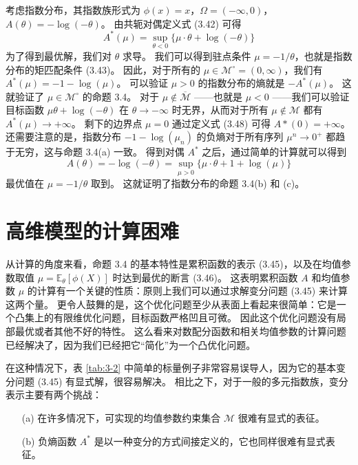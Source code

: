 \begin{tcolorbox}
\begin{exam}[指数模型的共轭对偶]
    
考虑指数分布，其指数族形式为 $\phi(x) = x$，$\Omega = (-\infty, 0)$，$A(\theta) = -\log(-\theta)$。
由共轭对偶定义式 (3.42) 可得
\begin{equation}
    A^*(\mu) = \sup_{\theta < 0}\{\mu\cdot\theta + \log(-\theta)\}
\end{equation}
为了得到最优解，我们对 $\theta$ 求导。
我们可以得到驻点条件 $\mu = -1/\theta$，也就是指数分布的矩匹配条件 (3.43)。
因此，对于所有的 $\mu \in \mathcal{M}^\circ = (0, \infty)$，我们有 $A^*(\mu) = -1 - \log(\mu)$。
可以验证 $\mu > 0$ 的指数分布的熵就是 $-A^*(\mu)$。
这就验证了 $\mu \in \mathcal{M}^\circ$ 的命题 3.4。
对于 $\mu \notin \overline{\mathcal{M}}$ ——也就是 $\mu < 0$ ——我们可以验证目标函数 $\mu\theta + \log(-\theta)$ 在 $\theta \to -\infty$ 时无界，从而对于所有 $\mu \notin \mathcal{M}$ 都有 $A^*(\mu) \to +\infty$。
剩下的边界点 $\mu = 0$ 通过定义式 (3.48) 可得 $A*(0) = +\infty$。
还需要注意的是，指数分布 $-1-\log(\mu_n)$ 的负熵对于所有序列 $\mu^n \to 0^+$ 都趋于无穷，这与命题 3.4(a) 一致。
得到对偶 $A^*$ 之后，通过简单的计算就可以得到
$$A(\theta) = -\log(-\theta) = \sup_{\mu > 0}\{\mu\cdot\theta + 1 + \log(\mu)\}$$
最优值在 $\mu = -1/\theta$ 取到。
这就证明了指数分布的命题 3.4(b) 和 (c)。

\end{exam}
\end{tcolorbox}

\section{高维模型的计算困难}

从计算的角度来看，命题 3.4 的基本特性是累积函数的表示 (3.45)，以及在均值参数取值 $\mu = \mathbb{E}_{\theta}[\phi(X)]$ 时达到最优的断言 (3.46)。
这表明累积函数 $A$ 和均值参数 $\mu$ 的计算有一个关键的性质：原则上我们可以通过求解变分问题 (3.45) 来计算这两个量。
更令人鼓舞的是，这个优化问题至少从表面上看起来很简单：它是一个凸集上的有限维优化问题，目标函数严格凹且可微。
因此这个优化问题没有局部最优或者其他不好的特性。
这么看来对数配分函数和相关均值参数的计算问题已经解决了，因为我们已经把它“简化”为一个凸优化问题。

在这种情况下，表 \ref{tab:3-2} 中简单的标量例子非常容易误导人，因为它的基本变分问题 (3.45) 有显式解，很容易解决。
相比之下，对于一般的多元指数族，变分表示主要有两个挑战：

\begin{itemize}
    \item[(a)] 在许多情况下，可实现的均值参数约束集合 $\mathcal{M}$ 很难有显式的表征。
    \item[(b)] 负熵函数 $A^*$ 是以一种变分的方式间接定义的，它也同样很难有显式表征。
\end{itemize}

